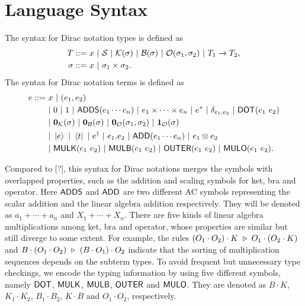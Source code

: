 \documentclass{article}
\begin{document}
\section{Language Syntax}
\begin{definition}[syntax]
    The syntax for Dirac notation types is defined as 
    \begin{align*}
        T ::=\ & x\ |\ \SType\ |\ \KType(\sigma)\ |\ \BType(\sigma)\ |\ \OType(\sigma_1, \sigma_2)\ |\ T_1 \to T_2, \\
        \sigma ::=\ & x\ |\ \sigma_1 \times \sigma_2.
    \end{align*}
    The syntax for Dirac notation terms is defined as
    \begin{align*}
        e ::=\ & x\ |\ (e_1, e_2) \\
        & |\ 0\ |\ 1\ |\ \ADDS(e_1 \cdots e_n) \ |\ e_1 \times \cdots \times e_n\ |\ e^* \ |\ \delta_{e_1, e_2}\ |\ \DOT(e_1\ e_2) \\
        & |\ \ZEROK(\sigma)\ |\ \ZEROB(\sigma)\ |\ \ZEROO(\sigma_1, \sigma_2)\ |\ \ONEO(\sigma) \\
        & |\ \ket{e}\ |\ \bra{t}\ |\ e^\dagger\ |\ e_1.e_2\ |\ \ADD(e_1 \cdots e_n)\ |\ e_1 \otimes e_2 \\
        & |\ \MULK(e_1\ e_2)\ |\ \MULB(e_1\ e_2)\ |\ \OUTER(e_1\ e_2)\ |\ \MULO(e_1\ e_2).
    \end{align*}
\end{definition}

Compared to [?], this syntax for Dirac notations merges the symbols with overlapped properties, such as the addition and scaling symbols for ket, bra and operator.
Here $\mathsf{ADDS}$ and $\mathsf{ADD}$ are two different AC symbols representing the scalar addition and the linear algebra addition respectively. They will be denoted as $a_1 + \cdots + a_n$ and $X_1 + \cdots + X_n$.
There are five kinds of linear algebra multiplications among ket, bra and operator, whose properties are similar but still diverge to some extent. For example, the rules $(O_1 \cdot O_2) \cdot K\ \triangleright\ O_1 \cdot (O_2 \cdot K)$ and $B \cdot (O_1 \cdot O_2) \ \triangleright\ (B \cdot O_1) \cdot O_2$ indicate that the sorting of multiplication sequences depends on the subterm types. To avoid frequent but unnecessary type checkings, we encode the typing information by using five different symbols, namely $\mathsf{DOT}$, $\mathsf{MULK}$, $\mathsf{MULB}$, $\mathsf{OUTER}$ and $\mathsf{MULO}$. They are denoted as $B\cdot K$, $K_1 \cdot K_2$, $B_1 \cdot B_2$, $K \cdot B$ and $O_1 \cdot O_2$, respectively.
 
\end{document}
